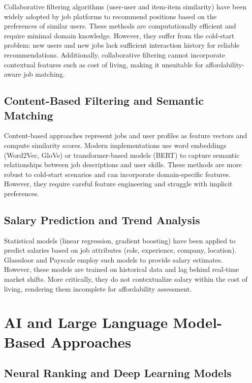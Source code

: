 \documentclass[12pt,a4paper,oneside]{report}
\begin{document}
Collaborative filtering algorithms (user-user and item-item similarity) have been widely adopted by job platforms to recommend positions based on the preferences of similar users. These methods are computationally efficient and require minimal domain knowledge. However, they suffer from the cold-start problem: new users and new jobs lack sufficient interaction history for reliable recommendations. Additionally, collaborative filtering cannot incorporate contextual features such as cost of living, making it unsuitable for affordability-aware job matching.

\subsection{Content-Based Filtering and Semantic Matching}

Content-based approaches represent jobs and user profiles as feature vectors and compute similarity scores. Modern implementations use word embeddings (Word2Vec, GloVe) or transformer-based models (BERT) to capture semantic relationships between job descriptions and user skills. These methods are more robust to cold-start scenarios and can incorporate domain-specific features. However, they require careful feature engineering and struggle with implicit preferences.

\subsection{Salary Prediction and Trend Analysis}

Statistical models (linear regression, gradient boosting) have been applied to predict salaries based on job attributes (role, experience, company, location). Glassdoor and Payscale employ such models to provide salary estimates. However, these models are trained on historical data and lag behind real-time market shifts. More critically, they do not contextualize salary within the cost of living, rendering them incomplete for affordability assessment.

\section{AI and Large Language Model-Based Approaches}

\subsection{Neural Ranking and Deep Learning Models}
\end{document}
